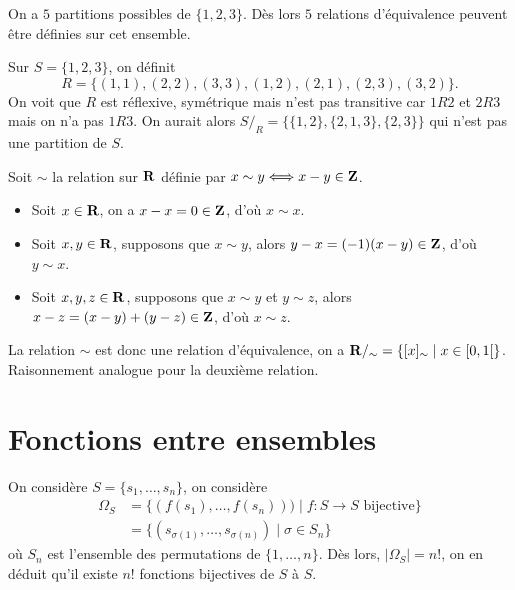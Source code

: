 \begin{exercice}
    On a $5$ partitions possibles de $\{1,2,3\}$. Dès lors $5$ relations d'équivalence peuvent être définies sur cet ensemble.
\end{exercice}

\begin{exercice}
    Sur $S = \{1,2,3\}$, on définit
    \[
    R = \{(1,1), (2,2), (3,3), (1,2), (2,1), (2,3), (3,2)\}.
    \]
    On voit que $R$ est réflexive, symétrique mais n'est pas transitive car $1R2$ et $2R3$ mais on n'a pas $1R3$.
    On aurait alors $S /_R = \{\{1,2\}, \{2, 1, 3\}, \{2, 3\}\}$ qui n'est pas une partition de $S$.
\end{exercice}

\begin{exercice}
    Soit $\sim$ la relation sur $\mathbf{R}$ définie par $x \sim y \Longleftrightarrow x - y \in \mathbf{Z}$.
    \begin{itemize}
        \item Soit $x \in \mathbf{R}$, on a $x - x = 0 \in \mathbf{Z}$, d'où $x \sim x$.
        \item Soit $x,y \in \mathbf{R}$, supposons que $x \sim y$, alors $y - x = (-1)(x - y) \in \mathbf{Z}$, d'où $y \sim x$.
        \item Soit $x,y,z \in \mathbf{R}$, supposons que $x \sim y$ et $y \sim z$, alors $x - z = (x - y) + (y - z) \in \mathbf{Z}$, d'où $x \sim z$.
    \end{itemize}
    La relation $\sim$ est donc une relation d'équivalence, on a $\mathbf{R} /_\sim = \{[x]_\sim \mid x \in [0, 1[\}$.
    Raisonnement analogue pour la deuxième relation.
\end{exercice}

\section{Fonctions entre ensembles}

\begin{exercice}
    On considère $S = \{s_1,\dots,s_n\}$, on considère 
    \begin{align*}
        \Omega_S &= \{(f(s_1),\dots,f(s_n))) \mid f : S \to S \text{ bijective}\} \\
                 &= \{(s_{\sigma(1)},\dots,s_{\sigma(n)}) \mid \sigma \in S_n\}
    \end{align*}
    où $S_n$ est l'ensemble des permutations de $\{1,\dots,n\}$. Dès lors, $|\Omega_S| = n!$, 
    on en déduit qu'il existe $n!$ fonctions bijectives de $S$ à $S$.
\end{exercice}

